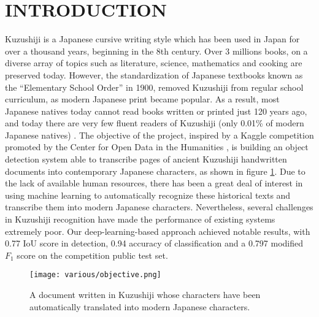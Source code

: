 \section{INTRODUCTION}
\label{sec:intro}

Kuzushiji is a Japanese cursive writing style which has been used in Japan for over a thousand years, beginning in the 8th century. Over 3 millions books, on a diverse array of topics such as literature, science, mathematics and cooking are preserved today. However, the standardization of Japanese textbooks known as the “Elementary School Order” in 1900, removed Kuzushiji from regular school curriculum, as modern Japanese print became popular. As a result, most Japanese natives today cannot read books written or printed just 120 years ago, and today there are very few fluent readers of Kuzushiji (only 0.01\% of modern Japanese natives) \cite{aboutkuz}. The objective of the project, inspired by a Kaggle competition promoted by the Center for Open Data in the Humanities \cite{competition}, is building an object detection system able to transcribe pages of ancient Kuzushiji handwritten documents into contemporary Japanese characters, as shown in figure \ref{fig:objective}. Due to the lack of available human resources, there has been a great deal of interest in using machine learning to automatically recognize these historical texts and transcribe them into modern Japanese characters. Nevertheless, several challenges in Kuzushiji recognition have made the performance of existing systems extremely poor. Our deep-learning-based approach achieved notable results, with 0.77 IoU score in detection, 0.94 accuracy of classification and a 0.797 modified $F_1$ score on the competition public test set.

\begin{figure}
	\centering
	\caption{A document written in Kuzushiji whose characters have been automatically translated into modern Japanese characters.}
	\texttt{[image: various/objective.png]}
	\label{fig:objective}
\end{figure}